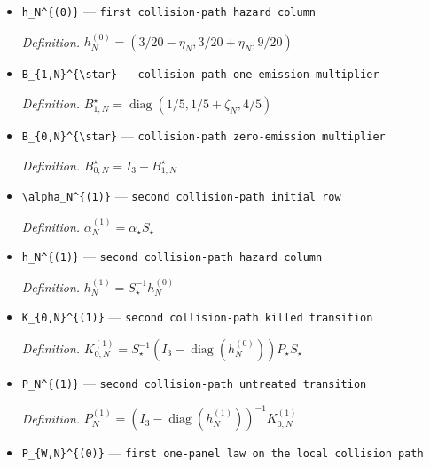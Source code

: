 \documentclass{article}
\begin{document}
\begin{itemize}
  \par\smallskip\noindent\emph{Definition.} \(S_{\star}=((9/10,1/10,0),(1/10,9/10,0),(0,0,1))\)
  \item \texttt{h\_\allowbreak{}N\textasciicircum{}\{(0)\}\allowbreak{}} --- \texttt{first collision-\allowbreak{}path hazard column}
  \par\smallskip\noindent\emph{Definition.} \(h_N^{(0)}=(3/20-\eta_N,3/20+\eta_N,9/20)\)
  \item \texttt{B\_\allowbreak{}\{1,\allowbreak{}N\}\allowbreak{}\textasciicircum{}\{\textbackslash{}\allowbreak{}star\}\allowbreak{}} --- \texttt{collision-\allowbreak{}path one-\allowbreak{}emission multiplier}
  \par\smallskip\noindent\emph{Definition.} \(B_{1,N}^{\star}=\operatorname{diag}(1/5,1/5+\zeta_N,4/5)\)
  \item \texttt{B\_\allowbreak{}\{0,\allowbreak{}N\}\allowbreak{}\textasciicircum{}\{\textbackslash{}\allowbreak{}star\}\allowbreak{}} --- \texttt{collision-\allowbreak{}path zero-\allowbreak{}emission multiplier}
  \par\smallskip\noindent\emph{Definition.} \(B_{0,N}^{\star}=I_3-B_{1,N}^{\star}\)
  \item \texttt{\textbackslash{}\allowbreak{}alpha\_\allowbreak{}N\textasciicircum{}\{(1)\}\allowbreak{}} --- \texttt{second collision-\allowbreak{}path initial row}
  \par\smallskip\noindent\emph{Definition.} \(\alpha_N^{(1)}=\alpha_{\star}S_{\star}\)
  \item \texttt{h\_\allowbreak{}N\textasciicircum{}\{(1)\}\allowbreak{}} --- \texttt{second collision-\allowbreak{}path hazard column}
  \par\smallskip\noindent\emph{Definition.} \(h_N^{(1)}=S_{\star}^{-1}h_N^{(0)}\)
  \item \texttt{K\_\allowbreak{}\{0,\allowbreak{}N\}\allowbreak{}\textasciicircum{}\{(1)\}\allowbreak{}} --- \texttt{second collision-\allowbreak{}path killed transition}
  \par\smallskip\noindent\emph{Definition.} \(K_{0,N}^{(1)}=S_{\star}^{-1}(I_3-\operatorname{diag}(h_N^{(0)}))P_{\star}S_{\star}\)
  \item \texttt{P\_\allowbreak{}N\textasciicircum{}\{(1)\}\allowbreak{}} --- \texttt{second collision-\allowbreak{}path untreated transition}
  \par\smallskip\noindent\emph{Definition.} \(P_N^{(1)}=(I_3-\operatorname{diag}(h_N^{(1)}))^{-1}K_{0,N}^{(1)}\)
  \item \texttt{P\_\allowbreak{}\{W,\allowbreak{}N\}\allowbreak{}\textasciicircum{}\{(0)\}\allowbreak{}} --- \texttt{first one-\allowbreak{}panel law on the local collision path}

\end{itemize}
\end{document}
